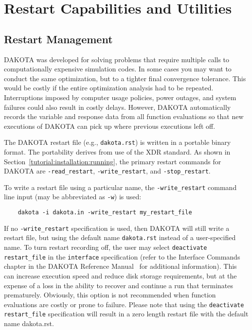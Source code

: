 \chapter{Restart Capabilities and Utilities}\label{restart}

\section{Restart Management}\label{restart:management}

DAKOTA was developed for solving problems that require multiple calls
to computationally expensive simulation codes. In some cases you may
want to conduct the same optimization, but to a tighter final
convergence tolerance. This would be costly if the entire optimization
analysis had to be repeated. Interruptions imposed by computer usage
policies, power outages, and system failures could also result in
costly delays. However, DAKOTA automatically records the variable and
response data from all function evaluations so that new executions of
DAKOTA can pick up where previous executions left off.

The DAKOTA restart file (e.g., \texttt{dakota.rst}) is written in a
portable binary format. The portability derives from use of the XDR
standard.  As shown in Section~\ref{tutorial:installation:running}, 
the primary restart commands for DAKOTA are \texttt{-read\_restart}, 
\texttt{-write\_restart}, and \texttt{-stop\_restart}.

To write a restart file using a particular name, the
\texttt{-write\_restart} command line input (may be abbreviated as
\texttt{-w}) is used:
\begin{small}
\begin{verbatim}
    dakota -i dakota.in -write_restart my_restart_file
\end{verbatim}
\end{small}
If no \texttt{-write\_restart} specification is used, then DAKOTA will
still write a restart file, but using the default name
\texttt{dakota.rst} instead of a user-specified name.  To turn restart
recording off, the user may select \texttt{deactivate restart\_file}
in the \texttt{interface} specification (refer to the Interface
Commands chapter in the DAKOTA Reference Manual~\cite{RefMan} for
additional information).  This can increase execution speed and reduce
disk storage requirements, but at the expense of a loss in the ability
to recover and continue a run that terminates prematurely.  Obviously,
this option is not recommended when function evaluations are costly or
prone to failure. Please note that using the \texttt{deactivate restart\_file}
specification will result in a zero length restart file
with the default name dakota.rst.

